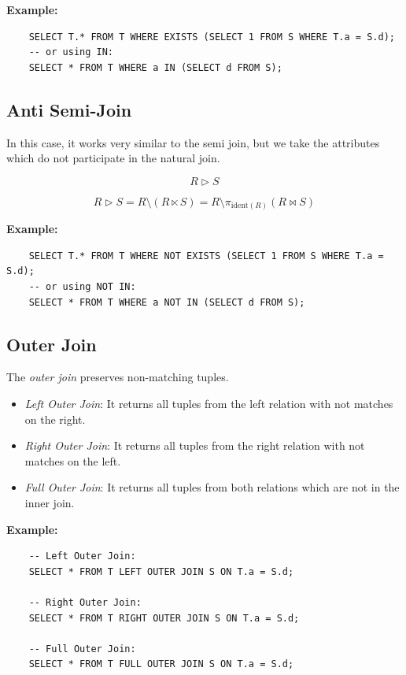 \textbf{Example:}

\begin{verbatim}
    SELECT T.* FROM T WHERE EXISTS (SELECT 1 FROM S WHERE T.a = S.d);
    -- or using IN:
    SELECT * FROM T WHERE a IN (SELECT d FROM S);
\end{verbatim}

\subsection{Anti Semi-Join}

In this case, it works very similar to the semi join, but we take the attributes which do not participate in the natural join.

\[
    R \triangleright S
\]

\[
    R \triangleright S = R \setminus (R \ltimes S) = R \setminus \pi_{\mathrm{ident}(R)}(R \bowtie S)
\]

\textbf{Example:}

\begin{verbatim}
    SELECT T.* FROM T WHERE NOT EXISTS (SELECT 1 FROM S WHERE T.a = S.d);
    -- or using NOT IN:
    SELECT * FROM T WHERE a NOT IN (SELECT d FROM S);
\end{verbatim}

\subsection{Outer Join}

The \emph{outer join} preserves non-matching tuples.

\begin{itemize}
    \item \emph{Left Outer Join}: It returns all tuples from the left relation with not matches on the right. 
    \item \emph{Right Outer Join}: It returns all tuples from the right relation with not matches on the left.
    \item \emph{Full Outer Join}: It returns all tuples from both relations which are not in the inner join.
\end{itemize}

\textbf{Example:}

\begin{verbatim}
    -- Left Outer Join:
    SELECT * FROM T LEFT OUTER JOIN S ON T.a = S.d;

    -- Right Outer Join:
    SELECT * FROM T RIGHT OUTER JOIN S ON T.a = S.d;

    -- Full Outer Join:
    SELECT * FROM T FULL OUTER JOIN S ON T.a = S.d;
\end{verbatim}

